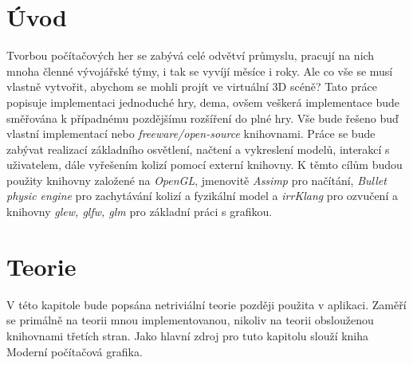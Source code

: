 
\chapter{Úvod}
Tvorbou počítačových her se zabývá celé odvětví průmyslu, pracují na nich mnoha členné vývojářské týmy, i tak se vyvíjí měsíce i roky. Ale co vše se musí vlastně vytvořit, abychom se mohli projít ve virtuální 3D scéně? Tato práce popisuje implementaci jednoduché hry, dema, ovšem veškerá implementace bude směřována k případnému pozdějšímu rozšíření do plné hry. Vše bude řešeno buď vlastní implementací nebo \emph{freeware/open-source} knihovnami.
Práce se bude zabývat realizací základního osvětlení, načtení a vykreslení modelů, interakcí s uživatelem, dále vyřešením kolizí pomocí externí knihovny. K těmto cílům budou použity knihovny založené na \emph{OpenGL}, jmenovitě \emph{Assimp}\cite{assimp} pro načítání, \emph{Bullet physic engine}\cite{bullet} pro zachytávání kolizí a fyzikální model a \emph{irrKlang}\cite{irrklang} pro ozvučení a knihovny \emph{glew\cite{glew}, glfw\cite{glfw}, glm\cite{glm}} pro základní práci s grafikou.           

\chapter{Teorie}
V této kapitole bude popsána netriviální teorie později použita v aplikaci. Zaměří se primálně na teorii mnou implementovanou, nikoliv na teorii obslouženou knihovnami třetích stran. Jako hlavní zdroj pro tuto kapitolu slouží kniha Moderní počítačová grafika\cite{MPGbook}. 
